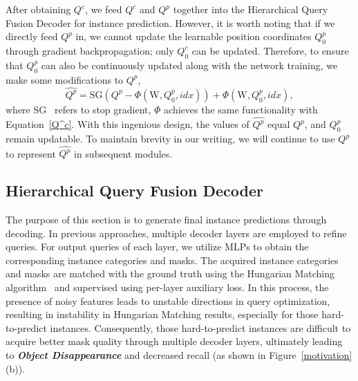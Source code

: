 After obtaining $Q^c$, we feed $Q^c$ and $Q^p$ together into the Hierarchical Query Fusion Decoder for instance prediction. However, it is worth noting that if we directly feed $Q^p$ in, we cannot update the learnable position coordinates $Q^p_0$ through gradient backpropagation; only $Q^c_0$ can be updated. Therefore, to ensure that $Q^p_0$ can also be continuously updated along with the network training, we make some modifications to $Q^p$,
\begin{equation}
  \label{sg}
  \widehat{Q^p} = \text{SG}(Q^p-\Phi (\text{W},Q^p_0,idx)) + \Phi(\text{W},Q^p_0,idx),
\end{equation}
where $\text{SG}$~\cite{van2017neural} refers to stop gradient, $\Phi$ achieves the same functionality with Equation~\ref{Q^c}. With this ingenious design, the values of $\widehat{Q^p}$ equal $Q^p$, and $Q^p_0$ remain updatable. %
To maintain brevity in our writing, we will continue to use $Q^p$ to represent $\widehat{Q^p}$ in subsequent modules.
\subsection{Hierarchical Query Fusion Decoder}
\label{hqfd}
The purpose of this section is to generate final instance predictions through decoding. 
In previous approaches, multiple decoder layers are employed to refine queries. For output queries of each layer, we utilize MLPs to obtain the corresponding instance categories and masks. The acquired instance categories and masks are matched with the ground truth using the Hungarian Matching algorithm~\cite{kuhn1955hungarian} and supervised using per-layer auxiliary loss. 
In this process, the presence of noisy features leads to unstable directions in query optimization, resulting in instability in Hungarian Matching results, especially for those hard-to-predict instances. Consequently, those hard-to-predict instances are difficult to acquire better mask quality through multiple decoder layers, ultimately leading to \textit{\textbf{Object Disappearance}} and decreased recall (as shown in Figure~\ref{motivation} (b)).

